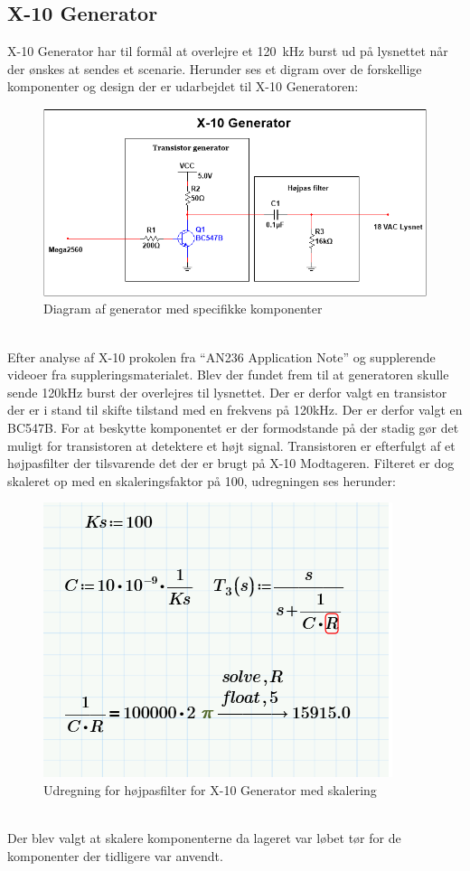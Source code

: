 \documentclass[11pt]{article}
\begin{document}
\subsection{X-10 Generator}
X-10 Generator har til formål at overlejre et \SI{120}{\kilo\hertz} burst ud på lysnettet når der ønskes at sendes et scenarie. Herunder ses et digram over de forskellige komponenter og design der er udarbejdet til X-10 Generatoren:
\begin{figure}[!h]
\centering
\includegraphics[scale = 0.9]{X10-generator-ms}
\caption{Diagram af generator med specifikke komponenter}
\end{figure}\\
Efter analyse af X-10 prokolen fra ``AN236 Application Note'' og supplerende videoer fra suppleringsmaterialet. Blev der fundet frem til at generatoren skulle sende 120kHz burst der overlejres til lysnettet. Der er derfor valgt en transistor der er i stand til skifte tilstand med en frekvens på 120kHz. Der er derfor valgt en BC547B. For at beskytte komponentet er der formodstande på der stadig gør det muligt for transistoren at detektere et højt signal. Transistoren er efterfulgt af et højpasfilter der tilsvarende det der er brugt på X-10 Modtageren. Filteret er dog skaleret op med en skaleringsfaktor på 100, udregningen ses herunder:
\begin{figure}[!h]
\centering
\includegraphics[scale = 0.5]{udregningHPgenerator}
\caption{Udregning for højpasfilter for X-10 Generator med skalering}
\end{figure}\\
Der blev valgt at skalere komponenterne da lageret var løbet tør for de komponenter der tidligere var anvendt.
\end{document}
